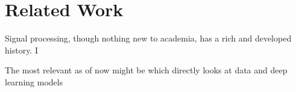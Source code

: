 \chapter{Related Work}
\label{chap:relwork}

Signal processing, though nothing new to academia, has a rich and developed history. I 


The most relevant as of now might be \cite{s21196627} which directly looks at  data and deep learning models




